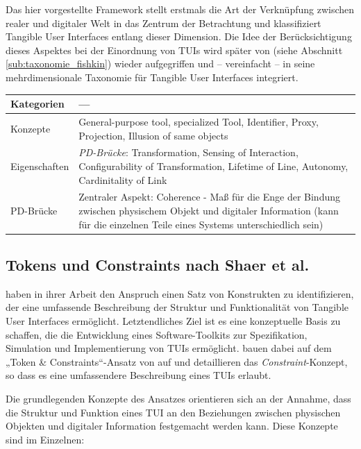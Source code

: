 Das hier vorgestellte Framework stellt erstmals die Art der Verknüpfung zwischen realer und digitaler Welt in das Zentrum der Betrachtung und klassifiziert Tangible User Interfaces entlang dieser Dimension. Die Idee der Berücksichtigung dieses Aspektes bei der Einordnung von \glspl{TUI} wird später von \citet{Fishkin04} (siehe Abschnitt \ref{sub:taxonomie_fishkin}) wieder aufgegriffen und -- vereinfacht -- in seine mehrdimensionale Taxonomie für Tangible User Interfaces integriert.
\\[1em]
\begin{tabular}{| p{3cm} | p{10cm} |}
  \hline
  Kategorien & --- \\ \hline
  Konzepte & General-purpose tool, specialized Tool, Identifier, Proxy, Projection, Illusion of same objects \\ \hline
  Eigenschaften & \emph{PD-Brücke}: Transformation, Sensing of Interaction, Configurability of Transformation, Lifetime of Line, Autonomy, Cardinitality of Link \\ \hline
  PD-Brücke & Zentraler Aspekt: Coherence - Maß für die Enge der Bindung zwischen physischem Objekt und digitaler Information (kann für die einzelnen Teile eines Systems unterschiedlich sein) \\ \hline
\end{tabular} 


\subsection{Tokens und Constraints nach Shaer et al.} %
\label{sub:tokens_und_constraints_nach_shaer_et_al_}

\citet{Shaer04} haben in ihrer Arbeit den Anspruch einen Satz von Konstrukten zu identifizieren, der eine umfassende Beschreibung der Struktur und Funktionalität von Tangible User Interfaces ermöglicht. Letztendliches Ziel ist es eine konzeptuelle Basis zu schaffen, die die Entwicklung eines Software-Toolkits zur Spezifikation, Simulation und Implementierung von \glspl{TUI} ermöglicht. \citet{Shaer04} bauen dabei auf dem „Token \& Constraints“-Ansatz von \citet{Ullmer02} auf und detaillieren das \emph{Constraint}-Konzept, so dass es eine umfassendere Beschreibung eines \glspl{TUI} erlaubt. 

Die grundlegenden Konzepte des Ansatzes orientieren sich an der Annahme, dass die Struktur und Funktion eines \gls{TUI} an den Beziehungen zwischen physischen Objekten und digitaler Information festgemacht werden kann. Diese Konzepte sind im Einzelnen:

